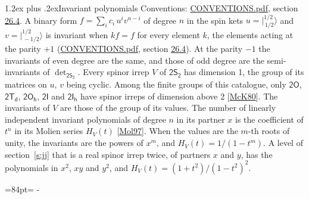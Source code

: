 \documentclass[10pt,a4paper]{article}
\makeatletter
\renewcommand\section{\@startsection{section}{1}{\z@}{-3ex plus -1ex minus -.2ex}%
  {1.2ex plus .2ex}{\normalfont\large\sffamily\bfseries\color{parttitle}}}
\newcommand{\needspace}[1]{\par\penalty-100\begingroup\dimen0=#1\relax\dimen2=\pagegoal
  \advance\dimen2-\pagetotal\ifdim\dimen0>\dimen2\relax\ifdim\dimen2>0pt\vfil\break\fi\fi
  \endgroup}
\numberwithin{equation}{section}
\newcommand{\grp}[1]{\mathsf{#1}}
\newcommand{\jm}[2]{\bigl\lvert{}^{#1}_{\,#2}\bigr\rangle}
\makeatother
\begin{document}
\section{Invariant polynomials}\label{s:invariants}
Conventions: \href{../../CONVENTIONS.pdf}{CONVENTIONS.pdf}, section \href{../../CONVENTIONS.pdf\#conv.26.4}{26.4}.
\leavevmode\label{n:local.binary.form}A binary form $f = \sum_i c_i\, u^i v^{n-i}$ of degree $n$ in the spin kets $u = \jm{1/2}{1/2}$ and $v = \jm{1/2}{-1/2}$ is invariant when $k f = f$ for every element $k$, the elements acting at the parity $+1$ (\href{../../CONVENTIONS.pdf}{CONVENTIONS.pdf}, section \href{../../CONVENTIONS.pdf\#conv.26.4}{26.4}). At the parity $-1$ the invariants of even degree are the same, and those of odd degree are the semi-invariants of $\det_{\grp{2S_{2}}}$.
\leavevmode\label{n:function.hilbert}Every spinor irrep $V$ of $\grp{2S_{2}}$ has dimension 1, the group of its matrices on $u$, $v$ being cyclic. Among the finite groups of this catalogue, only $\grp{2O}$, $\grp{2T_{d}}$, $\grp{2O_{h}}$, $\grp{2I}$ and $\grp{2I_{h}}$ have spinor irreps of dimension above 2 [\href{../../../REFERENCES.pdf\#ref.McK80}{McK80}]. The invariants of $V$ are those of the group of its values. \label{n:local.partner.x}The number of linearly independent invariant polynomials of degree $n$ in its partner $x$ is the coefficient of $t^n$ in its Molien series $H_V(t)$ [\href{../../../REFERENCES.pdf\#ref.Mol97}{Mol97}]. When the values are the $m$-th roots of unity, the invariants are the powers of $x^{m}$, and $H_V(t) = 1/(1 - t^{m})$. A level of section~\ref{s:jj} that is a real spinor irrep twice, of partners $x$ and $y$, has the polynomials in $x^{2}$, $xy$ and $y^{2}$, and $H_V(t) = (1 + t^{2})/(1 - t^{2})^{2}$.
\needspace{84pt}
\end{document}
